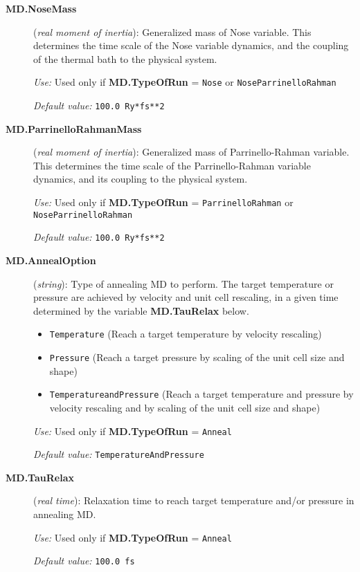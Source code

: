 \documentclass[11pt]{article}
\begin{document}
\begin{description}
\item[{\bf MD.NoseMass}] ({\it real moment of inertia}): 
Generalized mass of Nose variable.
This determines the time scale of the Nose variable
dynamics, and the coupling of the thermal bath to
the physical system.

{\it Use:} Used only if {\bf MD.TypeOfRun} = {\tt Nose} or 
{\tt NoseParrinelloRahman}

{\it Default value:} {\tt 100.0 Ry*fs**2}

\item[{\bf MD.ParrinelloRahmanMass}] ({\it real moment of inertia}): 
Generalized mass of Parrinello-Rahman variable.
This determines the time scale 
of the Parrinello-Rahman variable
dynamics, and its coupling to
the physical system.

{\it Use:} Used only if {\bf MD.TypeOfRun} = {\tt ParrinelloRahman} 
or {\tt NoseParrinelloRahman}

{\it Default value:} {\tt 100.0 Ry*fs**2}

\item[{\bf MD.AnnealOption}] ({\it string}): 
Type of annealing MD to perform. The target temperature or pressure are
achieved by velocity and unit cell rescaling, 
in a given time determined by the variable
{\bf MD.TauRelax} below.
\begin{itemize}
\item {\tt Temperature} (Reach a target temperature by velocity rescaling)
\item {\tt Pressure} (Reach a target pressure by scaling of the unit
cell size and shape)
\item {\tt TemperatureandPressure}  (Reach a target temperature 
and pressure by velocity rescaling and by scaling of the unit
cell size and shape)
\end{itemize}

{\it Use:} Used only if {\bf MD.TypeOfRun} = {\tt Anneal}

{\it Default value:} {\tt TemperatureAndPressure}

\item[{\bf MD.TauRelax}] ({\it real time}): 
Relaxation time to reach target temperature
and/or pressure in annealing MD.

{\it Use:} Used only if {\bf MD.TypeOfRun} = {\tt Anneal}

{\it Default value:} {\tt 100.0 fs}


\end{description}
\end{document}
